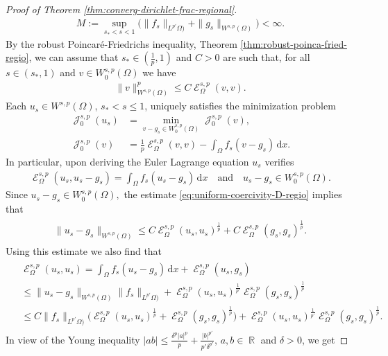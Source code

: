 \documentclass[12pt, reqno]{amsart}%
\theoremstyle{plain}  %
\theoremstyle{definition}  %
\theoremstyle{remark}
\numberwithin{equation}{section}
\DeclareMathOperator{\cE}{\mathcal{E}}
\DeclareMathOperator{\cJ}{\mathcal{J}}
\DeclareMathOperator{\R}{\mathbb{R}}
\renewcommand{\d}{\,\mathrm{d}}
\begin{document}
\begin{proof}[Proof of Theorem \ref{thm:converg-dirichlet-frac-regional}]
\begin{align}
M:= 	\sup_{s_*<s<1}\big(\|f_s \|_{L^{p'}\Omega)}+\|g_s \|_{W^{s,p}(\Omega)}\big)<\infty.
\end{align}
By the robust Poincar{\'e}-Friedrichs inequality, Theorem \ref{thm:robust-poinca-fried-regio}, we can assume that $s_* \in (\frac{1}{p},1)$ and $C>0$ are such that, for all $s\in ( s_*,1)$ and $v \in W^{s,p}_0(\Omega)$ we have
%
\begin{align}\label{eq:uniform-coercivity-D-regio}
\|v\|^p_{W^{s,p}(\Omega)}\leq C\cE^{s,p}_\Omega(v,v).
\end{align}
Each $u_s\in W^{s,p}(\Omega)$, $s_*<s\leq 1$, uniquely  satisfies the minimization problem
\begin{align*}
\cJ^{s,p}_0(u_s) &= \min_{v-g_s\in W^{s,p}_0(\Omega)} \cJ^{s,p}_0(v),\\
\cJ^{s,p}_0(v) &= \tfrac{1}{p} \cE^{s,p}_\Omega(v,v)
-\int_\Omega f_s(v-g_s)\d x.
\end{align*}
In particular,  upon deriving the Euler Lagrange equation $u_s$ verifies
\begin{align*}
\cE^{s,p}_\Omega(u_s,u_s-g_s)
=  \int_\Omega f_s ( u_s-g_s)\d x \quad \text{and}\quad u_s-g_s\in W^{s,p}_0(\Omega).
\end{align*}
Since  $u_s-g_s\in W^{s,p}_0(\Omega),$ the estimate \eqref{eq:uniform-coercivity-D-regio} implies that
\begin{align*}
\begin{split}
\| u_s-g_s \|_{W^{s,p}(\Omega)}
\leq C\cE^{s,p}_\Omega(u_s,u_s)^{\frac{1}{p}}+ C\cE^{s,p}_\Omega(g_s,g_s)^{\frac{1}{p}}.
\end{split}
\end{align*}
Using this estimate  we also find that
%
\begin{align*}
\begin{split}
&\cE^{s,p}_\Omega(u_s,u_s)
=\int_\Omega f_s ( u_s-g_s)\d x +\cE^{s,p}_\Omega(u_s,g_s)\\
&\leq \| u_s-g_s \|_{W^{s,p}(\Omega)} \|f_s\|_{L^{p'}\Omega)}+\cE^{s,p}_\Omega(u_s,u_s)^{\frac{1}{p'}}\cE^{s,p}_\Omega(g_s,g_s)^{\frac{1}{p}}\\
&\leq  C \|f_s\|_{L^{p'}\Omega)}\big(
\cE^{s,p}_\Omega(u_s,u_s)^{\frac{1}{p}}+\cE^{s,p}_\Omega(g_s,g_s)^{\frac{1}{p}}\big)
+\cE^{s,p}_\Omega(u_s,u_s)^{\frac{1}{p'}}\cE^{s,p}_\Omega(g_s,g_s)^{\frac{1}{p}}.
\end{split}
\end{align*}
In view of the  Young inequality $|ab|\leq \frac{\delta^p |a|^p}{p}+ \frac{|b|^{p'}}{p'\delta^{p'}} $, $a,b\in \R$ and $\delta>0$,  we get


\end{proof}
\end{document}
